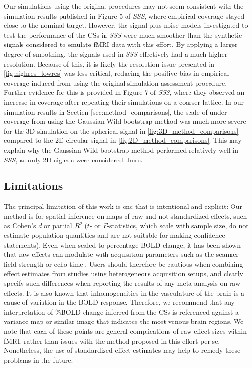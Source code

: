 Our simulations using the original procedures may not seem consistent with the simulation results published in Figure 5 of \textit{SSS}, where empirical coverage stayed close to the nominal target. However, the signal-plus-noise models investigated to test the performance of the CSs in \textit{SSS} were much smoother than the synthetic signals considered to emulate fMRI data with this effort. By applying a larger degree of smoothing, the signals used in \textit{SSS} effectively had a much higher resolution. Because of this, it is likely the resolution issue presented in \ref{fig:highres_lowres} was less critical, reducing the positive bias in empirical coverage induced from using the original simulation assessment procedure. Further evidence for this is provided in Figure 7 of \textit{SSS}, where they observed an increase in coverage after repeating their simulations on a coarser lattice. In our simulation results in Section \ref{sec:method_comparisons}, the scale of under-coverage from using the Gaussian Wild bootstrap method was much more severe for the 3D simulation on the spherical signal in \ref{fig:3D_method_comparisons} compared to the 2D circular signal in \ref{fig:2D_method_comparisons}. This may explain why the Gaussian Wild bootstrap method performed relatively well in \textit{SSS}, as only 2D signals were considered there. 

\subsection{Limitations}

The principal limitation of this work is one that is intentional and explicit: Our method is for spatial inference on maps of raw and not standardized effects, such as Cohen's $d$ or partial $R^{2}$ ($t$- or $F$-statistics, which scale with sample size, do not estimate population quantities and are not suitable for making  confidence statements). Even when scaled to percentage BOLD change, it has been shown that raw effects can modulate with acquisition parameters such as the scanner field strength or echo time \citep{UIudag2009-nm}. Users should therefore be cautious when combining effect estimates from studies using heterogeneous acquisition setups, and clearly specify such differences when reporting the results of any meta-analysis on raw effects. It is also known that inhomogeneities in the vasculature of the brain is a cause of variation in the BOLD response. Therefore, we recommend that any interpretation of \%BOLD change inferred from the CSs is referenced against a variance map or similar image that indicates the most venous brain regions. We note that each of these points are general complications of raw effect sizes within fMRI, rather than issues with the method proposed in this effort per se. Nonetheless, the use of standardized effect estimates may help to remedy these problems in the future.

